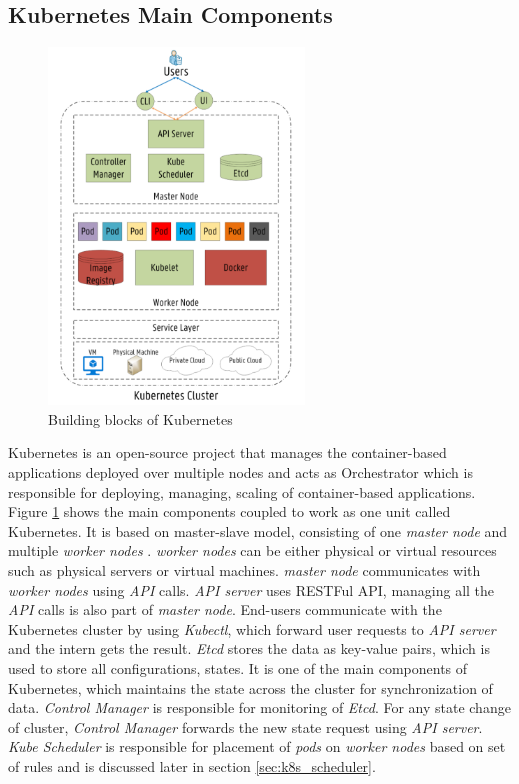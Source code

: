   \subsection{Kubernetes Main Components}
  \label{sec:k8s_main_comp}
  \begin{figure}
    \centering
    \includegraphics[width=68mm]{figures/mlcn-k8s-components.pdf}
    \caption{Building blocks of Kubernetes\cite{Santos2019}}
    \label{fig:k8s-comp}
  \end{figure}
  Kubernetes is an open-source project that manages the container-based applications deployed over multiple nodes and acts as Orchestrator which is responsible for deploying, managing, scaling of container-based applications\cite{k8s-git}. Figure \ref{fig:k8s-comp} shows the main components coupled to work as one unit called Kubernetes. It is based on master-slave model, consisting of one \emph{master node} and multiple \emph{worker nodes} \cite{Santos2019}. \emph{worker nodes} can be either physical or virtual resources such as physical servers or virtual machines. \emph{master node} communicates with \emph{worker nodes} using \emph{API} calls\cite{Santos2019}. \emph{API server} uses RESTFul API, managing all the \emph{API} calls is also part of \emph{master node}. End-users communicate with the Kubernetes cluster by using \emph{Kubectl}, which forward user requests to \emph{API server} and the intern gets the result. \emph{Etcd} stores the data as key-value pairs, which is used to store all configurations, states. It is one of the main components of Kubernetes, which maintains the state across the cluster for synchronization of data\cite{Santos2019}. \emph{Control Manager} is responsible for monitoring of \emph{Etcd}. For any state change of cluster, \emph{Control Manager} forwards the new state request using \emph{API server}\cite{Santos2019}. \emph{Kube Scheduler} is responsible for placement of \emph{pods} on \emph{worker nodes} based on set of rules and is discussed later in section \ref{sec:k8s_scheduler}. \par

